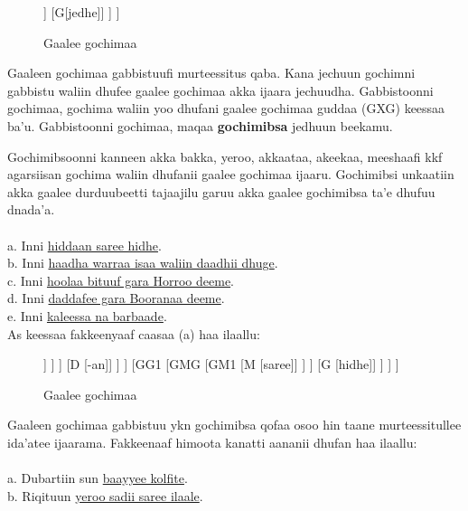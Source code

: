\documentclass[11pt,b5paper]{book}
\begin{document}
\begin{figure}[H]										
	\caption{Gaalee gochimaa}
	\centering
	\begin{forest}
		[GGG
			[GG1
				[H ['biyyi kee eessa?,roof]]
				[G[jedhe]]
			]
		]
	\end{forest}
\end{figure}


Gaaleen gochimaa gabbistuufi murteessitus qaba. Kana jechuun gochimni gabbistu waliin dhufee gaalee gochimaa akka
ijaara jechuudha. Gabbistoonni gochimaa, gochima waliin yoo dhufani gaalee gochimaa guddaa (GXG) keessaa ba’u.
Gabbistoonni gochimaa, maqaa \textbf{gochimibsa} jedhuun beekamu. 

Gochimibsoonni kanneen akka bakka, yeroo, akkaataa, akeekaa, meeshaafi kkf agarsiisan gochima waliin dhufanii gaalee gochimaa ijaaru. Gochimibsi unkaatiin akka gaalee durduubeetti tajaajilu garuu akka gaalee gochimibsa ta’e dhufuu dnada’a.\\
\\
a. Inni \underline{hiddaan saree hidhe}.\\
b. Inni \underline{haadha warraa isaa waliin daadhii dhuge}.\\
c. Inni \underline{hoolaa bituuf gara Horroo deeme}.\\
d. Inni \underline{daddafee gara Booranaa deeme}.\\
e. Inni \underline{kaleessa na barbaade}.\\

As keessaa fakkeenyaaf caasaa (a) haa ilaallu:

\begin{figure}[H]										
	\caption{Gaalee gochimaa}
	\centering
	\begin{forest}
		[GGG
			[GG1
				[GDG
					[GD1
						[GMG
							[GM1
								[M [hidda]]
							]
						]
						[D [-an]]
					]
				]
				[GG1
					[GMG
						[GM1
							[M [saree]]
						]
					]
					[G [hidhe]]
				]
			]		
		]
	\end{forest}
\end{figure}

Gaaleen gochimaa gabbistuu ykn gochimibsa qofaa osoo hin taane murteessitullee ida’atee ijaarama. Fakkeenaaf himoota kanatti aananii dhufan haa ilaallu: \\
\\
a. Dubartiin sun \underline{baayyee kolfite}.\\
b. Riqituun \underline{yeroo sadii saree ilaale}.\\
\end{document}
